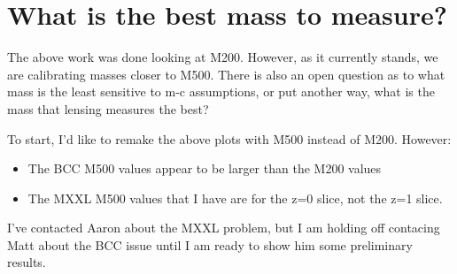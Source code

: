 \documentclass[11pt]{article}
\begin{document}
\clearpage \newpage

\section{What is the best mass to measure?}

The above work was done looking at M200. However, as it currently stands, we are calibrating masses closer to M500. There is also an open question as to what mass is the least sensitive to m-c assumptions, or put another way, what is the mass that lensing measures the best?

To start, I'd like to remake the above plots with M500 instead of M200. However:

\begin{itemize}
\item The BCC M500 values appear to be larger than the M200 values
\item The MXXL M500 values that I have are for the z=0 slice, not the z=1 slice.
\end{itemize}

I've contacted Aaron about the MXXL problem, but I am holding off contacing Matt about the BCC issue until I am ready to show him some preliminary results.



\clearpage \newpage
\end{document}

